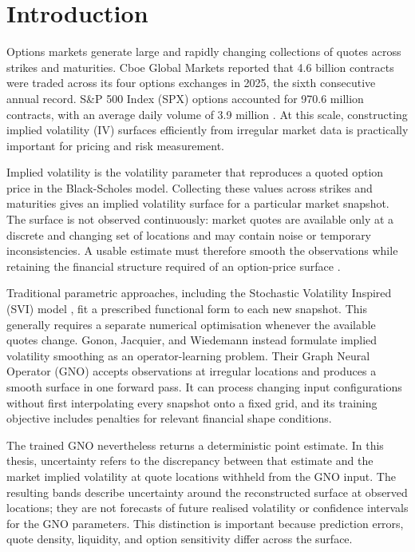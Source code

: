 \chapter{Introduction}
\label{chap:introduction}

Options markets generate large and rapidly changing collections of quotes across strikes and maturities. Cboe Global Markets reported that 4.6 billion contracts were traded across its four options exchanges in 2025, the sixth consecutive annual record. S\&P 500 Index (SPX) options accounted for 970.6 million contracts, with an average daily volume of 3.9 million \cite{cboe2025report}. At this scale, constructing implied volatility (IV) surfaces efficiently from irregular market data is practically important for pricing and risk measurement.

Implied volatility is the volatility parameter that reproduces a quoted option price in the Black-Scholes model. Collecting these values across strikes and maturities gives an implied volatility surface for a particular market snapshot. The surface is not observed continuously: market quotes are available only at a discrete and changing set of locations and may contain noise or temporary inconsistencies. A usable estimate must therefore smooth the observations while retaining the financial structure required of an option-price surface \cite{gonon2024operator}.

Traditional parametric approaches, including the Stochastic Volatility Inspired (SVI) model \cite{gatheral2014ssvi}, fit a prescribed functional form to each new snapshot. This generally requires a separate numerical optimisation whenever the available quotes change. Gonon, Jacquier, and Wiedemann \cite{gonon2024operator} instead formulate implied volatility smoothing as an operator-learning problem. Their Graph Neural Operator (GNO) accepts observations at irregular locations and produces a smooth surface in one forward pass. It can process changing input configurations without first interpolating every snapshot onto a fixed grid, and its training objective includes penalties for relevant financial shape conditions.

The trained GNO nevertheless returns a deterministic point estimate. In this thesis, uncertainty refers to the discrepancy between that estimate and the market implied volatility at quote locations withheld from the GNO input. The resulting bands describe uncertainty around the reconstructed surface at observed locations; they are not forecasts of future realised volatility or confidence intervals for the GNO parameters. This distinction is important because prediction errors, quote density, liquidity, and option sensitivity differ across the surface.

